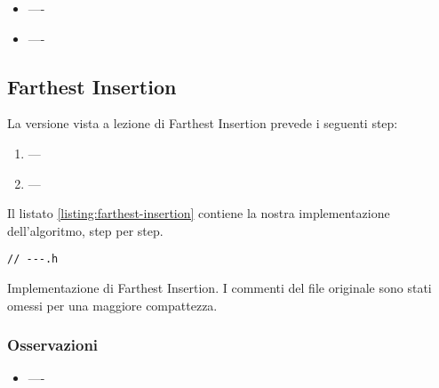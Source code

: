 \begin{itemize}
    \item ----\\

    \item ----\\

\end{itemize}


\subsection{Farthest Insertion}

La versione vista a lezione di Farthest Insertion prevede i seguenti step:

\begin{enumerate}
    \item ---
    \item ---
\end{enumerate}

\noindent Il listato \ref{listing:farthest-insertion} contiene la nostra implementazione dell'algoritmo, step per step.

\begin{listing}[!ht]
\begin{verbatim}
// ---.h

\end{verbatim}
\caption{Implementazione di Farthest Insertion. I commenti del file originale sono stati omessi per una maggiore compattezza.}
\label{listing:farthest-insertion}
\end{listing}

\subsubsection{Osservazioni}
\begin{itemize}
    \item ----\\

\end{itemize}
